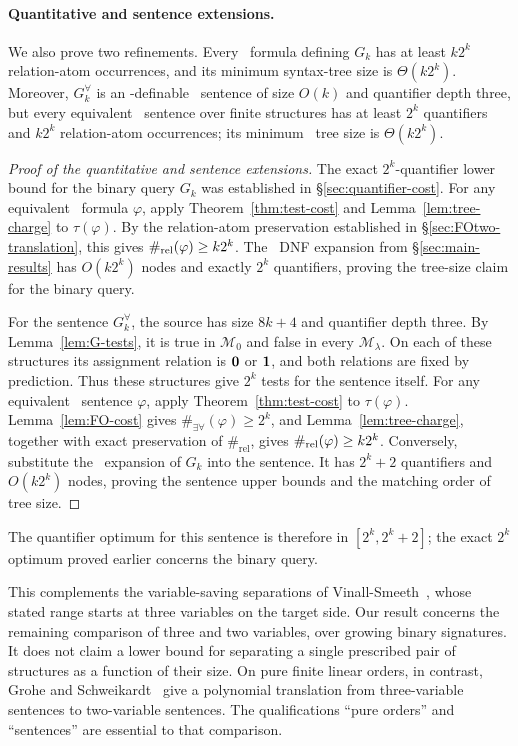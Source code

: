 \sentencebounds*
\paragraph{Quantitative and sentence extensions.}
We also prove two refinements. Every \FOtwo\ formula defining $G_k$
has at least $k2^k$ relation-atom occurrences, and its minimum
syntax-tree size is $\Theta(k2^k)$. Moreover, $G_k^\forall$ is an
\FOtwo-definable \FOthree\ sentence of size $O(k)$ and quantifier
depth three, but every equivalent \FOtwo\ sentence over finite
structures has at least $2^k$ quantifiers and $k2^k$ relation-atom
occurrences; its minimum \FOtwo\ tree size is $\Theta(k2^k)$.
\begin{proof}[Proof of the quantitative and sentence extensions]
The exact $2^k$-quantifier lower bound for the binary query $G_k$
was established in \S\ref{sec:quantifier-cost}. For any equivalent \FOtwo\
formula $\varphi$, apply Theorem~\ref{thm:test-cost} and
Lemma~\ref{lem:tree-charge} to $\tau(\varphi)$. By the
relation-atom preservation established in \S\ref{sec:FOtwo-translation},
this gives
$\#_{\mathrm{rel}}(\varphi)\ge k2^k$. The \FOtwo\ DNF expansion from
\S\ref{sec:main-results} has $O(k2^k)$ nodes and exactly $2^k$
quantifiers, proving the tree-size claim for the binary query.

For the sentence $G_k^\forall$, the source has size $8k+4$ and
quantifier depth three. By Lemma~\ref{lem:G-tests}, it is true in
$\mathcal M_0$ and false in every $\mathcal M_\lambda$. On each of
these structures its assignment relation is $\mathbf{0}$ or $\mathbf{1}$, and
both relations are fixed by prediction. Thus these structures give $2^k$ tests for the
sentence itself. For any equivalent \FOtwo\ sentence $\varphi$,
apply Theorem~\ref{thm:test-cost} to $\tau(\varphi)$.
Lemma~\ref{lem:FO-cost} gives $\#_{\exists\forall}(\varphi)\ge2^k$,
and Lemma~\ref{lem:tree-charge}, together with exact preservation of
$\#_{\mathrm{rel}}$, gives $\#_{\mathrm{rel}}(\varphi)\ge k2^k$.
Conversely, substitute the \FOtwo\ expansion of $G_k$ into the
sentence. It has $2^k+2$ quantifiers and $O(k2^k)$ nodes, proving the
sentence upper bounds and the matching order of tree size.
\end{proof}
The quantifier optimum for this sentence is therefore in
$[2^k,2^k+2]$; the exact $2^k$ optimum proved earlier concerns the binary
query.

This complements the variable-saving separations of
Vinall-Smeeth~\citep[Theorem~2]{vinall-smeeth2024}, whose stated range starts at three
variables on the target side. Our result concerns the remaining comparison
of three and two variables, over growing binary signatures. It does not
claim a lower bound for separating a single prescribed pair of structures
as a function of their size. On pure finite linear orders, in contrast,
Grohe and Schweikardt~\citep[Theorem~4.3]{grohe-schweikardt2005} give a polynomial translation
from three-variable sentences to two-variable sentences. The qualifications
``pure orders'' and ``sentences'' are essential to that comparison.

